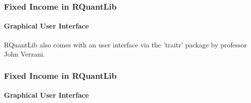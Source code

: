 \documentclass[compress]{beamer}
\begin{document}
\begin{frame}
	\frametitle{Fixed Income in RQuantLib}
	\framesubtitle{Graphical User Interface}		
RQuantLib also comes with an user interface via the 'traitr' package by professor John Verzani.
\begin{center}
\end{center}
\end{frame}

\begin{frame}
	\frametitle{Fixed Income in RQuantLib}
	\framesubtitle{Graphical User Interface}	
\begin{center}
\end{center}
\end{frame}
\end{document}
